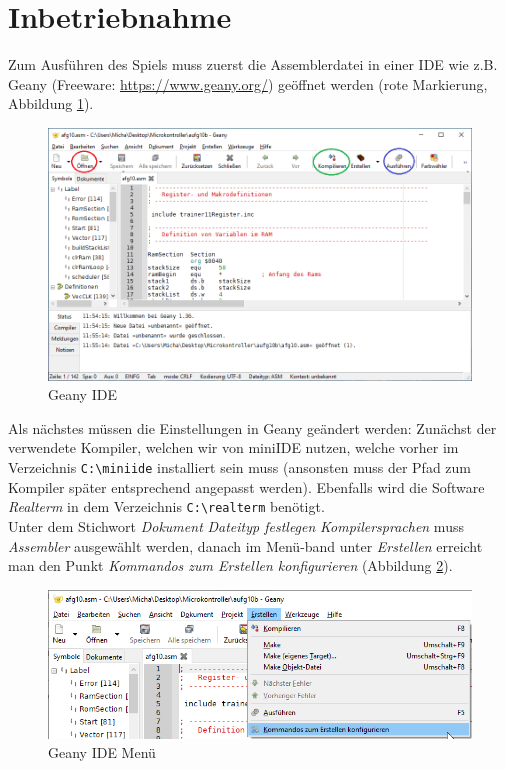 \section{Inbetriebnahme}
    Zum Ausführen des Spiels muss zuerst die Assemblerdatei in einer IDE wie z.B. Geany (Freeware: \url{https://www.geany.org/}) geöffnet werden (rote Markierung, Abbildung \ref{fig:geany}).
    \begin{figure}[H]
        \centering
        \includegraphics[scale=0.5]{img/geany.png}    
        \caption{Geany IDE}
        \label{fig:geany}
    \end{figure}
    Als nächstes müssen die Einstellungen in Geany geändert werden: 
    Zunächst der verwendete Kompiler, welchen wir von miniIDE nutzen, welche vorher im Verzeichnis \texttt{C:\textbackslash{}miniide} installiert sein muss (ansonsten muss der Pfad zum Kompiler später entsprechend angepasst werden).
    Ebenfalls wird die Software \textit{Realterm} in dem Verzeichnis \texttt{C:\textbackslash{}realterm} benötigt.
    \\
    Unter dem Stichwort \textit{Dokument} \textrightarrow{} \textit{Dateityp festlegen} \textrightarrow{} \textit{Kompilersprachen} muss \textit{Assembler} ausgewählt werden,
    danach im Menü-band unter \textit{Erstellen} erreicht man den Punkt \textit{Kommandos zum Erstellen konfigurieren} (Abbildung \ref{fig:geany-menu}).
    \begin{figure}[H]
        \centering
        \includegraphics[scale=0.5]{img/geany-menu.png}    
        \caption{Geany IDE Menü}
        \label{fig:geany-menu}
    \end{figure}
